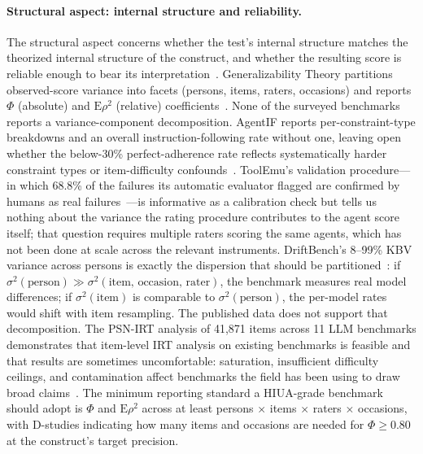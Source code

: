 \documentclass{article}
\begin{document}
\paragraph{Structural aspect: internal structure and reliability.}
The structural aspect concerns whether the test's internal structure matches the theorized internal structure of the construct, and whether the resulting score is reliable enough to bear its interpretation~\cite{messick1989, standards2014}. Generalizability Theory partitions observed-score variance into facets (persons, items, raters, occasions) and reports $\Phi$ (absolute) and $\mathrm{E}\rho^2$ (relative) coefficients~\cite{gtheoryage2025}. None of the surveyed benchmarks reports a variance-component decomposition. AgentIF reports per-constraint-type breakdowns and an overall instruction-following rate without one, leaving open whether the below-30\% perfect-adherence rate reflects systematically harder constraint types or item-difficulty confounds~\cite{agentif2025}. ToolEmu's validation procedure---in which 68.8\% of the failures its automatic evaluator flagged are confirmed by humans as real failures~\cite{toolemu2024}---is informative as a calibration check but tells us nothing about the variance the rating procedure contributes to the agent score itself; that question requires multiple raters scoring the same agents, which has not been done at scale across the relevant instruments. DriftBench's 8--99\% KBV variance across persons is exactly the dispersion that should be partitioned~\cite{driftbench2026}: if $\sigma^2(\text{person}) \gg \sigma^2(\text{item, occasion, rater})$, the benchmark measures real model differences; if $\sigma^2(\text{item})$ is comparable to $\sigma^2(\text{person})$, the per-model rates would shift with item resampling. The published data does not support that decomposition. The PSN-IRT analysis of 41{,}871 items across 11 LLM benchmarks demonstrates that item-level IRT analysis on existing benchmarks is feasible and that results are sometimes uncomfortable: saturation, insufficient difficulty ceilings, and contamination affect benchmarks the field has been using to draw broad claims~\cite{lostinbench2025}. The minimum reporting standard a HIUA-grade benchmark should adopt is $\Phi$ and $\mathrm{E}\rho^2$ across at least persons $\times$ items $\times$ raters $\times$ occasions, with D-studies indicating how many items and occasions are needed for $\Phi \geq 0.80$ at the construct's target precision.
\end{document}
